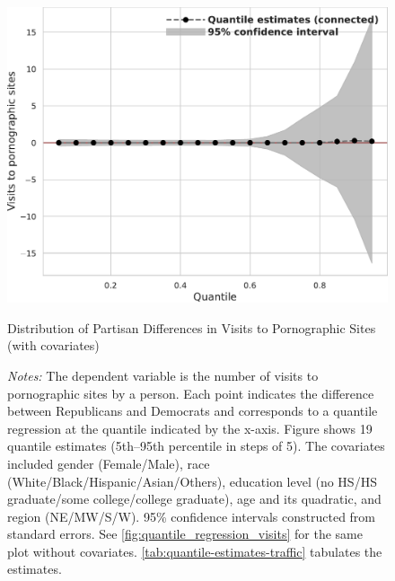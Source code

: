 \documentclass[12pt,twoside]{article}
\begin{document}
\begin{figure}
	\centering
	\includegraphics[width=.6\linewidth]{figs/quantile_reg_covariates_visits_adult.pdf}
	\caption{Distribution of Partisan Differences in Visits to Pornographic Sites (with covariates)}
	\caption*{\footnotesize \emph{Notes:} 
		The dependent variable is the number of visits to pornographic sites by a person.
		Each point indicates the difference between Republicans and Democrats and corresponds to a quantile regression at the quantile indicated by the x-axis.
  Figure shows 19 quantile estimates (5th--95th percentile in steps of 5).
		The covariates included gender (Female/Male), race (White/Black/Hispanic/Asian/Others), education level (no HS/HS graduate/some college/college graduate), age and its quadratic, and region (NE/MW/S/W).
		95\% confidence intervals constructed from standard errors.
		See \cref{fig:quantile_regression_visits} for the same plot without covariates.
            \cref{tab:quantile-estimates-traffic} tabulates the estimates.
	}
	\label{fig:quantile_regression_visits_covariates}
\end{figure}
\end{document}

